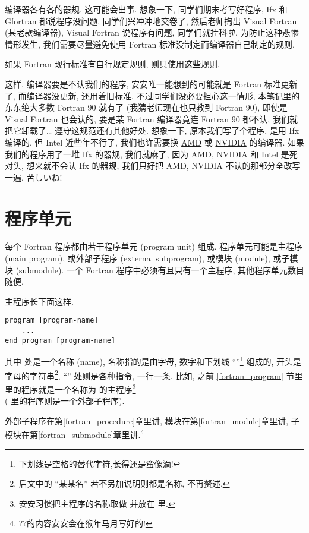 编译器各有各的器规, 这可能会出事. 想象一下, 同学们期末考写好程序, Ifx 和 Gfortran 都说程序没问题, 同学们兴冲冲地交卷了, 然后老师掏出 Visual Fortran (某老款编译器), Visual Fortran 说程序有问题, 同学们就挂科啦. 为防止这种悲惨情形发生, 我们需要尽量避免使用 Fortran 标准没制定而编译器自己制定的规则.
\begin{convention}\label{use_standard_only}
    如果 Fortran 现行标准有自行规定规则, 则只使用这些规则.
\end{convention}
这样, 编译器要是不认我们的程序, 安安唯一能想到的可能就是 Fortran 标准更新了, 而编译器没更新, 还用着旧标准. 不过同学们没必要担心这一情形, 本笔记里的东东绝大多数 Fortran 90 就有了 (我猜老师现在也只教到 Fortran 90), 即使是 Visual Fortran 也会认的, 要是某 Fortran 编译器竟连 Fortran 90 都不认, 我们就把它卸载了\dots{} 遵守这规范还有其他好处. 想象一下, 原本我们写了个程序, 是用 Ifx 编译的, 但 Intel 近些年不行了, 我们也许需要换 \href{https://www.amd.com/en/developer/aocc.html}{AMD} 或 \href{https://developer.nvidia.com/hpc-sdk#}{NVIDIA} 的编译器. 如果我们的程序用了一堆 Ifx 的器规, 我们就麻了, 因为 AMD, NVIDIA 和 Intel 是死对头, 想来就不会认 Ifx 的器规, 我们只好把 AMD, NVIDIA 不认的那部分全改写一遍, 苦しいね!

\section{程序单元}\label{program_unit}

每个 Fortran 程序都由若干程序单元 (program unit) 组成. 程序单元可能是主程序 (main program), 或外部子程序 (external subprogram), 或模块 (module), 或子模块 (submodule). 一个 Fortran 程序中必须有且只有一个主程序, 其他程序单元数目随便.

主程序长下面这样.
\begin{lstlisting}
program [program-name]
    ...
end program [program-name]
\end{lstlisting}
其中  处是一个名称 (name), 名称指的是由字母, 数字和下划线 ``\ttt{\_{}}''\footnote{
    下划线是空格的替代字符,长得还是蛮像滴!
} 组成的, 开头是字母的字符串\footnote{后文中的 ``某某名'' 若不另加说明则都是名称, 不再赘述.}, ``'' 处则是各种指令, 一行一条. 比如, 之前 \ref{fortran_program} 节里  里的程序就是一个名称为  的主程序\footnote{安安习惯把主程序的名称取做  并放在  里.} \\( 里的程序则是一个外部子程序).

外部子程序在第\ref{fortran_procedure}章里讲, 模块在第\ref{fortran_module}章里讲, 子模块在第\ref{fortran_submodule}章里讲.\footnote{??\mbox{}的内容安安会在猴年马月写好的!}

